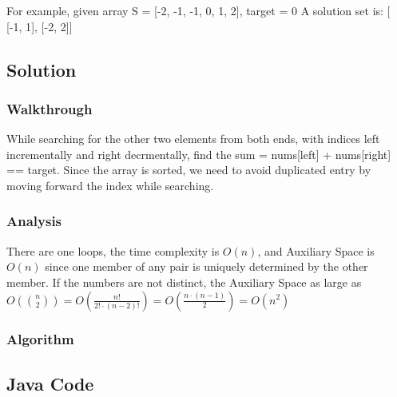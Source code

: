 \documentclass[]{book}
\begin{document}
For example, given array S = {[}-2, -1, -1, 0, 1, 2{]}, target = 0
A solution set is:
{[}
{[}-1, 1{]},
{[}-2, 2{]}{]}

\hypertarget{solution-2}{%
\subsection{Solution}\label{solution-2}}

\hypertarget{walkthrough-4}{%
\subsubsection{Walkthrough}\label{walkthrough-4}}

While searching for the other two elements from both ends, with indices left incrementally and right decrmentally, find
the sum = nums{[}left{]} + nums{[}right{]} == target. Since the array is
sorted, we need to avoid duplicated entry by moving forward the index while searching.

\hypertarget{analysis-4}{%
\subsubsection{Analysis}\label{analysis-4}}

There are one loops, the time complexity is \(O(n)\), and Auxiliary Space is \(O(n)\) since one member of any pair is
uniquely determined by the other member. If the numbers are not distinct, the Auxiliary Space as large as
\(O(\binom{n}{2}) = O(\frac{n!}{2!\cdot (n-2)!}) = O(\frac{n\cdot (n-1)}{2}) = O(n^2)\)

\hypertarget{algorithm-4}{%
\subsubsection{Algorithm}\label{algorithm-4}}

\hypertarget{java-code-2}{%
\subsection{Java Code}\label{java-code-2}}
\end{document}
